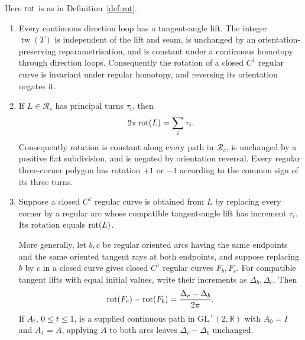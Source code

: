\begin{lemma}\label{lem:turnlift}
Here $\operatorname{rot}$ is as in Definition~\ref{def:rot}.
\begin{enumerate}
\item[(i)] Every continuous direction loop has a tangent-angle lift.
The integer $\operatorname{tw}(T)$ is independent of the lift and seam,
is unchanged by an orientation-preserving reparametrisation, and is constant
under a continuous homotopy through direction loops. Consequently the rotation
of a closed $C^1$ regular curve is invariant under regular homotopy, and
reversing its orientation negates it.
\item[(ii)] If $L\in\mathcal R_c$ has principal turns $\tau_i$, then
\[
   2\pi\operatorname{rot}(L)=\sum_i\tau_i.
\]
Consequently rotation is constant along every path in $\mathcal R_c$, is
unchanged by a positive flat subdivision, and is negated by orientation
reversal. Every regular three-corner polygon has rotation $+1$ or $-1$
according to the common sign of its three turns.
\item[(iii)] Suppose a closed $C^1$ regular curve is obtained from $L$ by
replacing every corner by a regular arc whose compatible tangent-angle lift
has increment $\tau_i$. Its rotation equals $\operatorname{rot}(L)$.

More generally, let $b,c$ be regular oriented arcs having the same endpoints
and the same oriented tangent rays at both endpoints, and suppose replacing
$b$ by $c$ in a closed curve gives closed $C^1$ regular curves $F_b,F_c$.
For compatible tangent lifts with equal initial values, write their increments
as $\Delta_b,\Delta_c$. Then
\[
   \operatorname{rot}(F_c)-\operatorname{rot}(F_b)=\frac{\Delta_c-\Delta_b}{2\pi}.
\]
If $A_t$, $0\leq t\leq1$, is a supplied continuous path in
$\mathrm{GL}^+(2,\mathbb R)$ with $A_0=I$ and $A_1=A$, applying $A$ to both
arcs leaves $\Delta_c-\Delta_b$ unchanged.
\end{enumerate}
\end{lemma}
